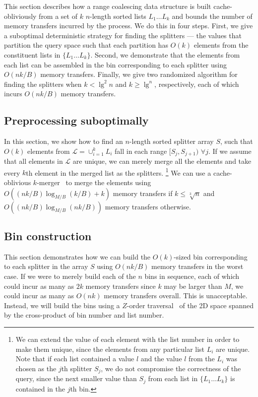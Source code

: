 
This section describes how a range coalescing data structure is built cache-obliviously
from a set of $k$ $n$-length sorted lists $L_1 \ldots L_k$ and bounds
the number of memory transfers incurred by the process.  We do this in four steps.
First, we give a suboptimal deterministic strategy for finding the splitters 
--- the values that partition the query space such that each partition has $O(k)$ 
elements from the constituent lists in $\{ L_1 \ldots L_k \}$.  Second, we 
demonstrate that the elements from each list can be assembled in the bin corresponding
to each splitter using $O(nk / B)$ memory transfers.  Finally, we give two randomized
algorithm for finding the splitters when $k < \lg^2 n$ and $k \geq \lg^ n$, 
respectively, each of which incurs $O(nk/B)$ memory transfers.  

\subsection*{Preprocessing suboptimally}

In this section, we show how to find an $n$-length sorted splitter array $S$, such that $O(k)$
elements from $\mathcal{L} = \cup_{i=1}^{k}L_i$ fall in each range 
$[S_j,S_{j+1})$ $\forall j$.  If we assume that all elements in $\mathcal{L}$ are 
unique, we can merely merge all the elements and take every $k$th element in the
merged list as the splitters.  \footnote{We can extend the value of each element with the
list number in order to make them unique, since the elements from any particular
list $L_i$ are unique.  Note that if each list contained a value $l$ and the
value $l$ from
the $L_i$ was chosen as the $j$th splitter $S_j$, we do not compromise the correctness of the 
query, since the next smaller value than $S_j$ from each list in $\{ L_1 \ldots L_k\}$ is 
contained in the $j$th bin.} We can use a cache-oblivious 
$k$-merger~\cite{FrigoLePr99} to merge the elements using 
$O((nk/B) \log_{M/B} (k/B) + k)$ memory transfers if $k \leq \sqrt[3]{n}$ and
$O((nk/B) \log_{M/B} (nk/B))$ memory transfers otherwise.



\subsection*{Bin construction}

This section demonstrates how we can build the $O(k)$-sized bin corresponding to each splitter
in the array $S$ using $O(nk/B)$ memory transfers in the worst case.
If we were to merely build each of the $n$ bins in sequence, each of which could
incur as many as $2k$ memory transfers since $k$ may be larger than $M$, we could
incur as many as $O(nk)$ memory transfers overall.  This is unacceptable.  
Instead, we will build the bins using a $Z$-order traversal~\cite{Morton66} of 
the 2D space spanned by the cross-product of bin number and list number.

